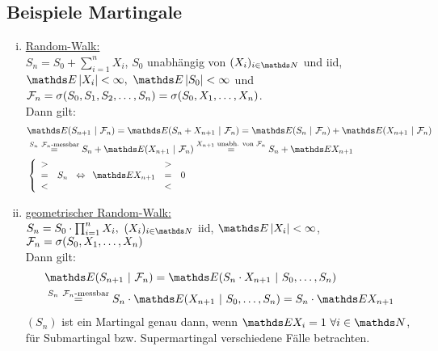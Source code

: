 \subsection{Beispiele Martingale}
\label{sub:bsp_martingale}
\begin{enumerate}[(i)]
	\item \uline{Random-Walk:}\\
	$S_n=S_0+\sum\limits_{i=1}^{n}X_i$, $S_0$ unabhängig von $(X_i)_{i\in \N}$ und iid, $\E\abs{X_i}<\infty,~\E\abs{S_0}<\infty$ und $\mathcal{F}_n=\sigma(S_0,S_1,S_2,\dots,S_n)=\sigma(S_0,X_1,\dots,X_n)$.\\
	Dann gilt:
	\begin{equation*}
	\begin{aligned}
		&\E(S_{n+1}~|~\F_n) = \E(S_n+X_{n+1}~|~\F_n) = \E(S_n~|~\F_n)+\E(X_{n+1}~|~\F_n)\\
		&\stackrel{S_n~\F_n\text{-messbar}}{=} S_n+\E(X_{n+1}~|~\F_n)\stackrel{\tiny X_{n+1}\text{ unabh. von }\F_n}{=}S_n+\E X_{n+1}\\
		&\left\{\begin{array}{lc} > & \\ = & S_n \\ < &   \end{array}\right. \Leftrightarrow \begin{array}{ccc}  & > & \\ \E X_{n+1} & = & 0\\ & < & \end{array}
	\end{aligned}
	\end{equation*}
	\item \uline{geometrischer Random-Walk:}\\
	$S_n=S_0\cdot\prod_{i=1}^{n}X_i,~(X_i)_{i\in \N}$ iid, $\E\abs{X_i}<\infty$, $\mathcal{F}_n=\sigma(S_0,X_1,\dots,X_n)$\\
	Dann gilt:
	\begin{equation*}
	\begin{aligned}
		&\E(S_{n+1}~|~\F_n) = \E(S_n\cdot X_{n+1}~|~S_0,\dots,S_n)\\
		&\stackrel{S_n~\F_n\text{-messbar}}{=} S_n\cdot\E(X_{n+1}~|~S_0,\dots,S_n)=S_n\cdot\E X_{n+1}
	\end{aligned}
	\end{equation*}
	$(S_n)$ ist ein Martingal genau dann, wenn $\E X_i=1~\forall i\in \N$, für Submartingal bzw. Supermartingal verschiedene Fälle betrachten.
\end{enumerate}


